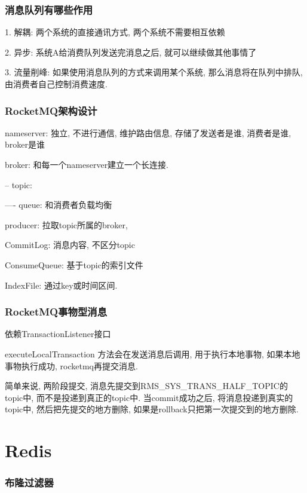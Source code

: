 \documentclass[UTF8]{ctexart}
\begin{document}
\subsubsection{消息队列有哪些作用}

1. 解耦: 两个系统的直接通讯方式, 两个系统不需要相互依赖

2. 异步: 系统A给消费队列发送完消息之后, 就可以继续做其他事情了

3. 流量削峰: 如果使用消息队列的方式来调用某个系统, 那么消息将在队列中排队, 由消费者自己控制消费速度.

\subsubsection{RocketMQ架构设计}
nameserver: 独立, 不进行通信, 维护路由信息, 存储了发送者是谁, 消费者是谁, broker是谁


broker: 和每一个nameserver建立一个长连接.

-- topic:

---- queue: 和消费者负载均衡

producer: 拉取topic所属的broker,

CommitLog: 消息内容, 不区分topic

ConsumeQueue: 基于topic的索引文件

IndexFile: 通过key或时间区间.
\subsubsection{RocketMQ事物型消息}
依赖TransactionListener接口

executeLocalTransaction 方法会在发送消息后调用, 用于执行本地事物, 如果本地事物执行成功, rocketmq再提交消息.

简单来说, 两阶段提交, 消息先提交到RMS\_SYS\_TRANS\_HALF\_TOPIC的topic中, 而不是投递到真正的topic中. 当commit成功之后, 将消息投递到真实的topic中, 然后把先提交的地方删除, 如果是rollback只把第一次提交到的地方删除.

\section{Redis}
\subsubsection{布隆过滤器}
\end{document}
